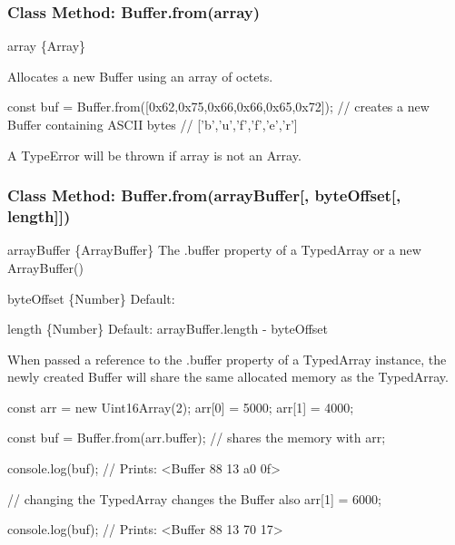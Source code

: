 \subsubsection*{Class Method\+: Buffer.\+from(array)}


\begin{DoxyItemize}
\item {\ttfamily array} \{Array\}
\end{DoxyItemize}

Allocates a new {\ttfamily Buffer} using an {\ttfamily array} of octets.


\begin{DoxyCode}
const buf = Buffer.from([0x62,0x75,0x66,0x66,0x65,0x72]);
  // creates a new Buffer containing ASCII bytes
  // ['b','u','f','f','e','r']
\end{DoxyCode}


A {\ttfamily Type\+Error} will be thrown if {\ttfamily array} is not an {\ttfamily Array}.

\subsubsection*{Class Method\+: Buffer.\+from(array\+Buffer\mbox{[}, byte\+Offset\mbox{[}, length\mbox{]}\mbox{]})}


\begin{DoxyItemize}
\item {\ttfamily array\+Buffer} \{Array\+Buffer\} The {\ttfamily .buffer} property of a {\ttfamily Typed\+Array} or a {\ttfamily new Array\+Buffer()}
\item {\ttfamily byte\+Offset} \{Number\} Default\+: {}
\item {\ttfamily length} \{Number\} Default\+: {\ttfamily array\+Buffer.\+length -\/ byte\+Offset}
\end{DoxyItemize}

When passed a reference to the {\ttfamily .buffer} property of a {\ttfamily Typed\+Array} instance, the newly created {\ttfamily Buffer} will share the same allocated memory as the Typed\+Array.


\begin{DoxyCode}
const arr = new Uint16Array(2);
arr[0] = 5000;
arr[1] = 4000;

const buf = Buffer.from(arr.buffer); // shares the memory with arr;

console.log(buf);
  // Prints: <Buffer 88 13 a0 0f>

// changing the TypedArray changes the Buffer also
arr[1] = 6000;

console.log(buf);
  // Prints: <Buffer 88 13 70 17>
\end{DoxyCode}


